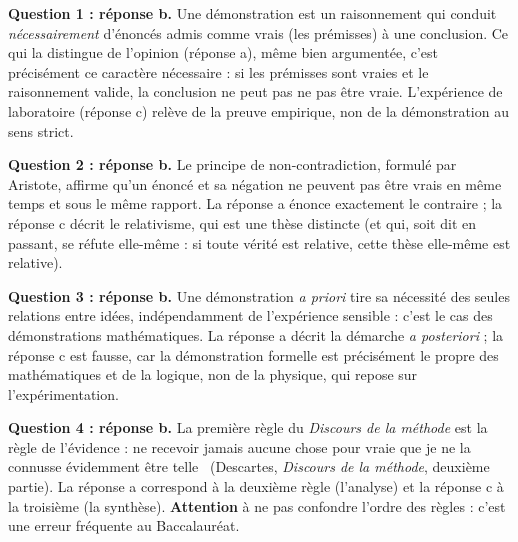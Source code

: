 \documentclass[11pt]{article}
\newcommand{\cle}[1]{{\popxbold\color{popdark}#1}}
\begin{document}
\begin{corrige}
\textbf{Question 1 : réponse b.} Une \cle{démonstration} est un raisonnement qui conduit \emph{nécessairement} d'énoncés admis comme vrais (les \cle{prémisses}) à une \cle{conclusion}. Ce qui la distingue de l'\cle{opinion} (réponse a), même bien argumentée, c'est précisément ce caractère nécessaire : si les prémisses sont vraies et le raisonnement \cle{valide}, la conclusion ne peut pas ne pas être vraie. L'expérience de laboratoire (réponse c) relève de la \cle{preuve empirique}, non de la démonstration au sens strict.

\textbf{Question 2 : réponse b.} Le \cle{principe de non-contradiction}, formulé par Aristote, affirme qu'un énoncé et sa négation ne peuvent pas être vrais en même temps et sous le même rapport. La réponse a énonce exactement le contraire ; la réponse c décrit le \cle{relativisme}, qui est une thèse distincte (et qui, soit dit en passant, se réfute elle-même : si toute vérité est relative, cette thèse elle-même est relative).

\textbf{Question 3 : réponse b.} Une démonstration \emph{a priori} tire sa nécessité des seules relations entre idées, indépendamment de l'expérience sensible : c'est le cas des démonstrations \cle{mathématiques}. La réponse a décrit la démarche \emph{a posteriori} ; la réponse c est fausse, car la \cle{démonstration formelle} est précisément le propre des mathématiques et de la logique, non de la physique, qui repose sur l'\cle{expérimentation}.

\textbf{Question 4 : réponse b.} La première règle du \emph{Discours de la méthode} est la \cle{règle de l'évidence} : \guillemotleft ne recevoir jamais aucune chose pour vraie que je ne la connusse évidemment être telle \guillemotright\ (Descartes, \emph{Discours de la méthode}, deuxième partie). La réponse a correspond à la deuxième règle (\cle{l'analyse}) et la réponse c à la troisième (\cle{la synthèse}). \textbf{Attention} à ne pas confondre l'ordre des règles : c'est une erreur fréquente au Baccalauréat.
\end{corrige}
\end{document}
